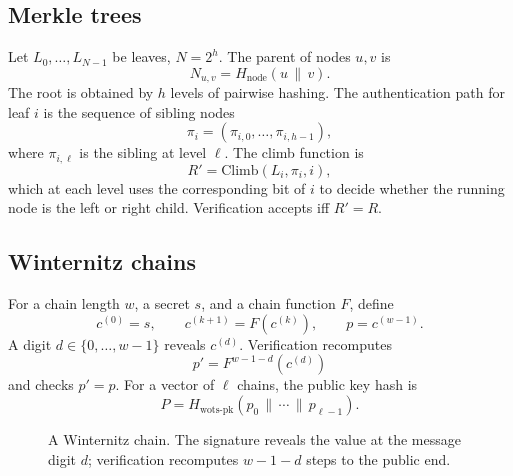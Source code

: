 \documentclass[11pt,a4paper]{article}
\theoremstyle{remark}
\newcommand{\concat}{\,\|\,}
\begin{document}
\subsection{Merkle trees}

Let \(L_0,\dots,L_{N-1}\) be leaves, \(N=2^h\). The parent of nodes \(u,v\) is
\[
N_{u,v}=H_{\text{node}}(u\concat v).
\]
The root is obtained by \(h\) levels of pairwise hashing. The authentication
path for leaf \(i\) is the sequence of sibling nodes
\[
\pi_i=(\pi_{i,0},\dots,\pi_{i,h-1}),
\]
where \(\pi_{i,\ell}\) is the sibling at level \(\ell\). The climb function is
\[
R'=\mathrm{Climb}(L_i,\pi_i,i),
\]
which at each level uses the corresponding bit of \(i\) to decide whether the
running node is the left or right child. Verification accepts iff \(R'=R\).

\subsection{Winternitz chains}

For a chain length \(w\), a secret \(s\), and a chain function \(F\), define
\[
c^{(0)}=s,\qquad c^{(k+1)}=F(c^{(k)}),\qquad p=c^{(w-1)}.
\]
A digit \(d\in\{0,\dots,w-1\}\) reveals \(c^{(d)}\). Verification recomputes
\[
p'=F^{w-1-d}(c^{(d)})
\]
and checks \(p'=p\). For a vector of \(\ell\) chains, the public key hash is
\[
P=H_{\text{wots-pk}}(p_0\concat\cdots\concat p_{\ell-1}).
\]

\begin{figure}[ht]
\centering
{}
\caption{A Winternitz chain. The signature reveals the value at the message
digit \(d\); verification recomputes \(w-1-d\) steps to the public end.}
\label{fig:wots}
\end{figure}
\end{document}
